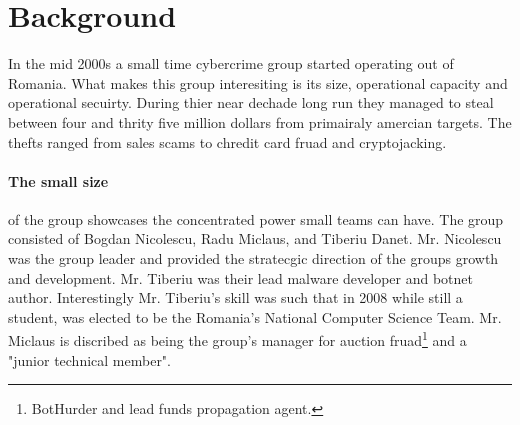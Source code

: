 \documentclass[fleqn,12pt]{SelfArx} %
\affiliation{\textsuperscript{1}\textit{Department of Computer Science and Engineering, Bagley College of Engineering, Mississippi State University}} %
\begin{document}
\renewcommand{\abstractname}{Issue}


\flushbottom %

\maketitle %


\thispagestyle{empty} %



\section*{Background} %
In the mid 2000s a small time cybercrime group started operating out of Romania.  What makes this group interesiting is its size, operational capacity and operational secuirty.  During thier near dechade long run they managed to steal between four and thrity five million dollars from primairaly amercian targets.  The thefts ranged from sales scams to chredit card fruad and cryptojacking.    

\paragraph{The small size} of the group showcases the concentrated power small teams can have.  The group consisted of Bogdan Nicolescu, Radu Miclaus, and Tiberiu Danet.  Mr. Nicolescu was the group leader and provided the stratecgic direction of the groups growth and development.  Mr. Tiberiu was their lead malware developer and botnet author.  Interestingly Mr. Tiberiu's skill was such that in 2008 while still a student, was elected to be the Romania's National Computer Science Team.\cite{Cimpanu:ZD:Bayrob}  Mr. Miclaus is discribed as being the group's manager for auction fruad\footnote{BotHurder and lead funds propagation agent.} and a "junior technical member"\cite{Symantech:Blog:Bayrob}.
\end{document}
